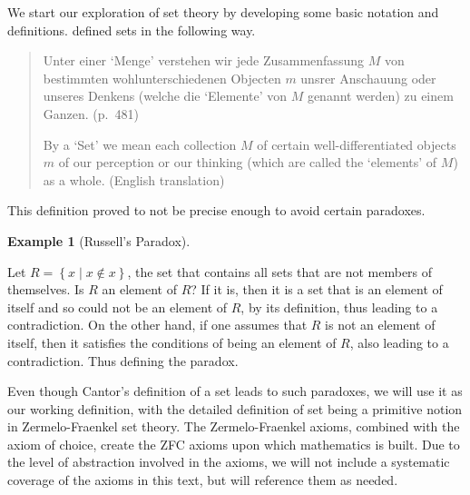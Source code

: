\documentclass[
]{book}
\theoremstyle{definition}
\theoremstyle{definition}
\newtheorem{example}{Example}[chapter]
\theoremstyle{definition}
\theoremstyle{definition}
\theoremstyle{remark}
\begin{document}
We start our exploration of set theory by developing some basic notation and definitions. \citet{Cantor} defined sets in the following way.

\begin{quote}
Unter einer `Menge' verstehen wir jede Zusammenfassung \(M\) von bestimmten wohlunterschiedenen Objecten \(m\) unsrer Anschauung oder unseres Denkens (welche die `Elemente' von \(M\) genannt werden) zu einem Ganzen. (p.~481)

By a `Set' we mean each collection \(M\) of certain well-differentiated objects \(m\) of our perception or our thinking (which are called the `elements' of \(M\)) as a whole. (English translation)
\end{quote}

This definition proved to not be precise enough to avoid certain paradoxes.

\begin{example}[Russell's Paradox]
\protect\hypertarget{exm:unlabeled-div-1}{}\label{exm:unlabeled-div-1}

Let \(R= \left\{ x \middle \vert x\notin x\right\}\), the set that contains all sets that are not members of themselves. Is \(R\) an element of \(R\)? If it is, then it is a set that is an element of itself and so could not be an element of \(R\), by its definition, thus leading to a contradiction. On the other hand, if one assumes that \(R\) is not an element of itself, then it satisfies the conditions of being an element of \(R\), also leading to a contradiction. Thus defining the paradox.

\end{example}

Even though Cantor's definition of a set leads to such paradoxes, we will use it as our working definition, with the detailed definition of set being a primitive notion in Zermelo-Fraenkel set theory. The Zermelo-Fraenkel axioms, combined with the axiom of choice, create the ZFC axioms upon which mathematics is built. Due to the level of abstraction involved in the axioms, we will not include a systematic coverage of the axioms in this text, but will reference them as needed.
\end{document}
